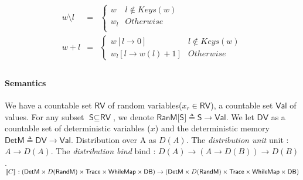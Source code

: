 \documentclass[a4paper,11pt]{article}
\begin{document}
%
\[
\begin{array}{ccl}
w \setminus l     & = &\left \{  
    \begin{array}{lr} w  & l \not\in Keys(w)   \\
      w_l & Otherwise \\
     \end{array} \right.\\
w + l & = &
 \left \{  
    \begin{array}{lr}
    w[l \to 0] & l \not \in Keys(w) \\   
    w_l [l \to w(l)+1] & Otherwise
          \end{array} \right.\\
\end{array}
\]
%
\paragraph{Semantics}
We have a countable set $\textsf{RV}$ of random variables($x_r \in \textsf{RV}$), a countable set $\textsf{Val}$ of values. For any subset  $\textsf{S} \subseteq \textsf{RV}$, we denote $\textsf{RanM[S]} \triangleq \textsf{S} \to \textsf{Val} $. We let $\textsf{DV}$ as a countable set of deterministic variables ($x$) and the deterministic memory $\textsf{DetM} \triangleq \textsf{DV} \to \textsf{Val}$. 
Distribution over A as $D(A)$. The \emph{distribution unit} unit : $A \to D(A)$. The \emph{distribution bind} bind : $ D(A) \to (A \to D(B)) \to D(B)$. $\llbracket C\rrbracket_{} : (\textsf{DetM} \times D(\textsf{RandM}) \times \textsf{Trace} \times \textsf{WhileMap} \times \textsf{DB} ) \to (\textsf{DetM} \times D(\textsf{RandM}) \times \textsf{Trace} \times \textsf{WhileMap} \times \textsf{DB} ) $
\end{document}
